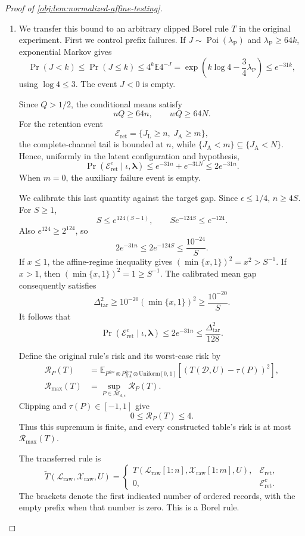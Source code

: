 \documentclass[11pt]{article}
\begin{document}
\begin{proof}[Proof of \cref{obj:lem:normalized-affine-testing}]
\begin{enumerate}
\item
We transfer this bound to an arbitrary clipped Borel rule \(T\) in the original experiment. First we control prefix failures. If
\(J\sim\operatorname{Poi}(\lambda_{\mathrm P})\) and
\(\lambda_{\mathrm P}\ge64k\), exponential Markov gives
\[
\Pr(J<k)
\le\Pr(J\le k)
\le4^k\mathbb E4^{-J}
=\exp\left(k\log4-\frac34\lambda_{\mathrm P}\right)
\le e^{-31k},
\]
using \(\log4\le3\). The event \(J<0\) is empty.

Since \(Q>1/2\), the conditional means satisfy
\[
uQ\ge64n,\qquad wQ\ge64N.
\]
For the retention event
\[
\mathcal E_{\mathrm{ret}}=\{J_{\mathrm L}\ge n,\ J_{\mathrm A}\ge m\},
\]
the complete-channel tail is bounded at \(n\), while
\(\{J_{\mathrm A}<m\}\subseteq\{J_{\mathrm A}<N\}\). Hence, uniformly in the latent configuration and hypothesis,
\[
\Pr(\mathcal E_{\mathrm{ret}}^c\mid\iota,\boldsymbol\lambda)
\le e^{-31n}+e^{-31N}\le2e^{-31n}.
\]
When \(m=0\), the auxiliary failure event is empty.

We calibrate this last quantity against the target gap. Since
\(\epsilon\le1/4\), \(n\ge4S\). For \(S\ge1\),
\[
S\le e^{124(S-1)},
\qquad
Se^{-124S}\le e^{-124}.
\]
Also \(e^{124}\ge2^{124}\), so
\[
2e^{-31n}\le2e^{-124S}\le\frac{10^{-24}}{S}.
\]
If \(x\le1\), the affine-regime inequality gives
\((\min\{x,1\})^2=x^2>S^{-1}\). If \(x>1\), then
\((\min\{x,1\})^2=1\ge S^{-1}\). The calibrated mean gap consequently satisfies
\[
\Delta_{\mathrm{tar}}^2
\ge10^{-20}(\min\{x,1\})^2
\ge\frac{10^{-20}}S.
\]
It follows that
\[
\Pr(\mathcal E_{\mathrm{ret}}^c\mid\iota,\boldsymbol\lambda)
\le2e^{-31n}
\le\frac{\Delta_{\mathrm{tar}}^2}{128}.
\]

Define the original rule's risk and its worst-case risk by
\[
\begin{aligned}
\mathcal R_P(T)
&=\mathbb E_{P^{\otimes n}\otimes P_{XA}^{\otimes m}
                  \otimes\mathrm{Uniform}[0,1]}
  [(T(\mathcal D,U)-\tau(P))^2],\\
\mathcal R_{\max}(T)
&=\sup_{P\in\mathcal M_{d,\epsilon}}\mathcal R_P(T).
\end{aligned}
\]
Clipping and \(\tau(P)\in[-1,1]\) give
\[
0\le\mathcal R_P(T)\le4.
\]
Thus this supremum is finite, and every constructed table's risk is at most \(\mathcal R_{\max}(T)\).

The transferred rule is
\[
\widetilde T(\mathcal L_{\mathrm{raw}},\mathcal X_{\mathrm{raw}},U)
=
\begin{cases}
T(\mathcal L_{\mathrm{raw}}[1:n],
  \mathcal X_{\mathrm{raw}}[1:m],U),
&\mathcal E_{\mathrm{ret}},\\
0,&\mathcal E_{\mathrm{ret}}^c.
\end{cases}
\]
The brackets denote the first indicated number of ordered records, with the empty prefix when that number is zero. This is a Borel rule.


\end{enumerate}
\end{proof}
\end{document}
